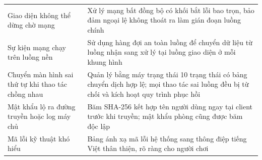 \begin{center}\small
\begin{tabularx}{\linewidth}{|L{4.4cm}|Y|}
\hline
{} &  \\ \hline
Giao diện không thể dừng chờ mạng & Xử lý mạng bất đồng bộ có khối bắt lỗi bao trọn, bảo đảm ngoại lệ không thoát ra làm gián đoạn luồng chính \\ \hline
Sự kiện mạng chạy trên luồng nền & Sử dụng hàng đợi an toàn luồng để chuyển dữ liệu từ luồng nhận sang xử lý tại luồng giao diện ở mỗi khung hình \\ \hline
Chuyển màn hình sai thứ tự khi thao tác chồng nhau & Quản lý bằng máy trạng thái 10 trạng thái có bảng chuyển dịch hợp lệ; mọi thao tác sai luồng đều bị từ chối và kích hoạt quy trình phục hồi \\ \hline
Mật khẩu lộ ra đường truyền hoặc log máy chủ & Băm SHA-256 kết hợp tên người dùng ngay tại client trước khi truyền; mật khẩu phòng cũng được băm độc lập \\ \hline
Mã lỗi kỹ thuật khó hiểu & Bảng ánh xạ mã lỗi hệ thống sang thông điệp tiếng Việt thân thiện, rõ ràng cho người chơi \\ \hline
\end{tabularx}
\end{center}


